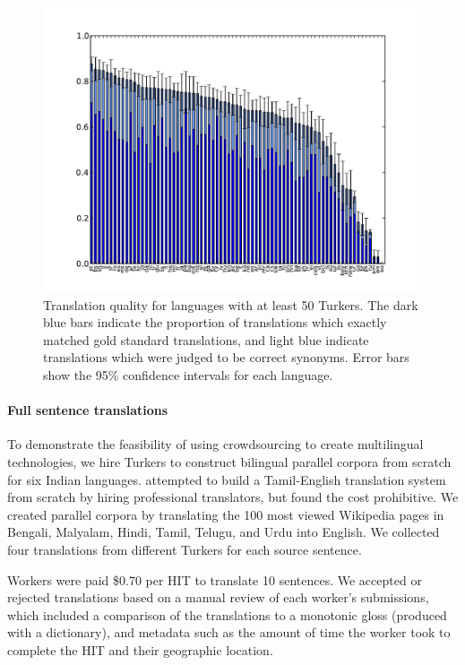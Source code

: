 \documentclass[11pt]{article}
\begin{document}
\begin{figure}[h]
\begin{center}
\includegraphics[width=.9\linewidth]{figures/quality_bar.pdf}
\caption{Translation quality for languages with at least 50 Turkers. The dark blue bars indicate the proportion of translations which exactly matched gold standard translations, and light blue indicate translations which were judged to be correct synonyms. Error bars show the 95\% confidence intervals for each language.}
\label{hitlangqual} 
\end{center}
\end{figure}

\paragraph{Full sentence translations}
To demonstrate the feasibility of using crowdsourcing to create multilingual technologies, we hire Turkers to construct bilingual parallel corpora from scratch for six Indian languages.   attempted to build a Tamil-English translation system from scratch by hiring professional translators, but found the cost prohibitive. We created parallel corpora by translating the 100 most viewed Wikipedia pages in Bengali, Malyalam, Hindi, Tamil, Telugu, and Urdu into English.  We collected four translations from different Turkers for each source sentence.  

Workers were paid \$0.70 per HIT to translate 10 sentences.  
 We  accepted or rejected translations based on a manual review of each worker's submissions, which included a comparison of the translations to a monotonic gloss (produced with a dictionary), and metadata such as the amount of time the worker took to complete the HIT and their geographic location.
\end{document}
